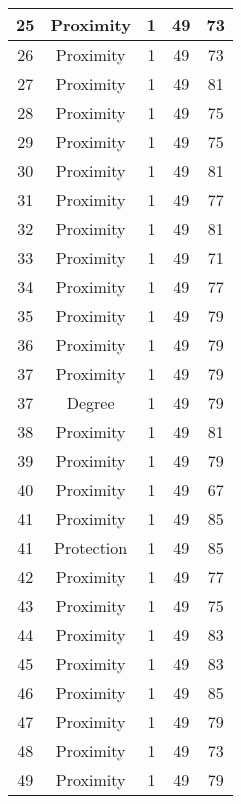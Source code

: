 \documentclass[results.tex]{subfiles}
\begin{document}
\begin{center}
\begin{tabular}{| c || c | c | c | c |}
    \hline
    25 & Proximity & 1 & 49 & 73 \\ 
    \hline
    26 & Proximity & 1 & 49 & 73 \\ 
    \hline
    27 & Proximity & 1 & 49 & 81 \\ 
    \hline
    28 & Proximity & 1 & 49 & 75 \\ 
    \hline
    29 & Proximity & 1 & 49 & 75 \\ 
    \hline
    30 & Proximity & 1 & 49 & 81 \\ 
    \hline
    31 & Proximity & 1 & 49 & 77 \\ 
    \hline
    32 & Proximity & 1 & 49 & 81 \\ 
    \hline
    33 & Proximity & 1 & 49 & 71 \\ 
    \hline
    34 & Proximity & 1 & 49 & 77 \\ 
    \hline
    35 & Proximity & 1 & 49 & 79 \\ 
    \hline
    36 & Proximity & 1 & 49 & 79 \\ 
    \hline
    37 & Proximity & 1 & 49 & 79 \\ 
    \hline
    37 & Degree & 1 & 49 & 79 \\ 
    \hline
    38 & Proximity & 1 & 49 & 81 \\ 
    \hline
    39 & Proximity & 1 & 49 & 79 \\ 
    \hline
    40 & Proximity & 1 & 49 & 67 \\ 
    \hline
    41 & Proximity & 1 & 49 & 85 \\ 
    \hline
    41 & Protection & 1 & 49 & 85 \\ 
    \hline
    42 & Proximity & 1 & 49 & 77 \\ 
    \hline
    43 & Proximity & 1 & 49 & 75 \\ 
    \hline
    44 & Proximity & 1 & 49 & 83 \\ 
    \hline
    45 & Proximity & 1 & 49 & 83 \\ 
    \hline
    46 & Proximity & 1 & 49 & 85 \\ 
    \hline
    47 & Proximity & 1 & 49 & 79 \\ 
    \hline
    48 & Proximity & 1 & 49 & 73 \\ 
    \hline
    49 & Proximity & 1 & 49 & 79 \\ 
    \hline   \end{tabular}
\end{center}
\end{document}
